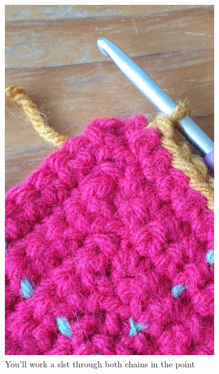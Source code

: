 \documentclass[openany]{book}
\begin{document}
\begin{figure}[H]\centering
\begin{subfigure}[t]{.3\textwidth}\centering
\includegraphics[width=.95\textwidth]{bk/slstcorner1}
\caption{You'll work a slst through both chains in the point}
\end{subfigure}
%
\begin{subfigure}[t]{.3\textwidth}
		\centering

\end{subfigure}
\end{figure}
\end{document}
